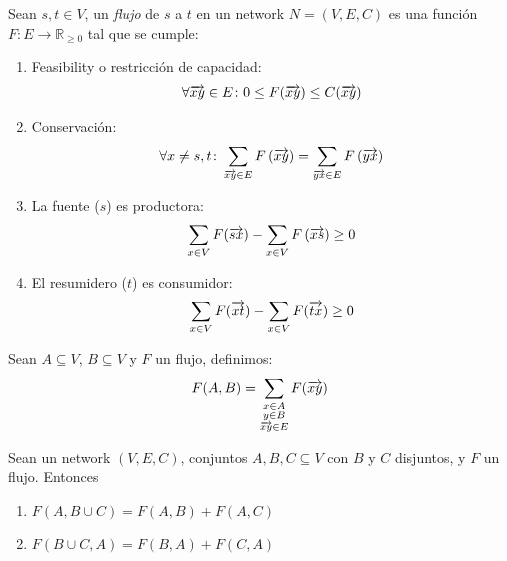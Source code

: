\begin{definition}
  Sean $s,t \in V$, un \emph{flujo} de $s$ a $t$ en un network $N = (V, E, C)$
  es una función $F \colon E \to \mathbb{R}_{\ge 0}$ tal que se cumple:
  \begin{enumerate}
  \item Feasibility o restricción de capacidad:
    \begin{align}
      \forall \overrightarrow{xy} \in E \colon 0 \le F(\overrightarrow{xy}) \le C(\overrightarrow{xy}) \label{feasible}
    \end{align}

  \item Conservación:
    \begin{align}
      \forall x \neq s,t \colon \sum_{\substack{\overrightarrow{xy} \in E}} F\left(\overrightarrow{xy}\right)
      = \sum_{\substack{\overrightarrow{yx} \in E}} F\left(\overrightarrow{yx}\right) \label{conservacion}
    \end{align}

  \item La fuente ($s$) es productora:
    \begin{align}
      \sum_{x \in V} F(\overrightarrow{sx}) - \sum_{x \in V} F\left(\overrightarrow{xs}\right) \ge 0 \label{fuente}
    \end{align}

  \item El resumidero ($t$) es consumidor:
    \begin{align}
      \sum_{x \in V} F(\overrightarrow{xt}) - \sum_{x \in V} F(\overrightarrow{tx}) \ge 0 \label{resumidero}
    \end{align}
  \end{enumerate}
\end{definition}

\begin{definition}
Sean $A \subseteq V$, $B \subseteq V$ y $F$ un flujo, definimos:
\begin{align}
  F(A, B) = \sum_{\substack{x \in A \\ y \in B \\ \overrightarrow{xy} \in E}} F(\overrightarrow{xy}) \nonumber
\end{align}
\end{definition}

\begin{proposition}
  Sean un network $(V,E,C)$, conjuntos $A, B, C \subseteq V$ con $B$ y $C$ disjuntos,
  y $F$ un flujo. Entonces
  \begin{enumerate}
    \item $F(A, B \cup C) = F(A,B) + F(A,C)$
    \item $F(B \cup C, A) = F(B,A) + F(C,A)$   
  \end{enumerate}
\end{proposition}

